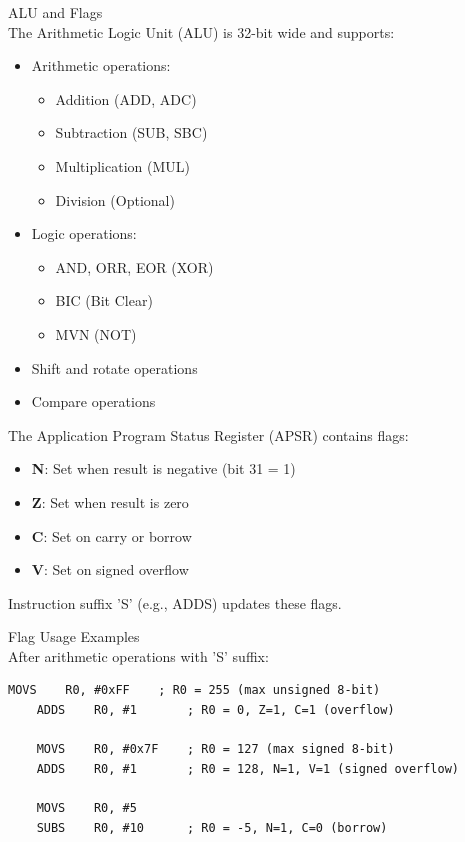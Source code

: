\begin{definition}{ALU and Flags}\\
The Arithmetic Logic Unit (ALU) is 32-bit wide and supports:
\begin{itemize}
  \item Arithmetic operations:
    \begin{itemize}
      \item Addition (ADD, ADC)
      \item Subtraction (SUB, SBC)
      \item Multiplication (MUL)
      \item Division (Optional)
    \end{itemize}
  \item Logic operations:
    \begin{itemize}
      \item AND, ORR, EOR (XOR)
      \item BIC (Bit Clear)
      \item MVN (NOT)
    \end{itemize}
  \item Shift and rotate operations
  \item Compare operations
\end{itemize}

The Application Program Status Register (APSR) contains flags:
\begin{itemize}
  \item \textbf{N}: Set when result is negative (bit 31 = 1)
  \item \textbf{Z}: Set when result is zero
  \item \textbf{C}: Set on carry or borrow
  \item \textbf{V}: Set on signed overflow
\end{itemize}

Instruction suffix 'S' (e.g., ADDS) updates these flags.
\end{definition}

\begin{example2}{Flag Usage Examples}\\
After arithmetic operations with 'S' suffix:
\begin{lstlisting}[language=armasm, style=base]
    MOVS    R0, #0xFF    ; R0 = 255 (max unsigned 8-bit)
    ADDS    R0, #1       ; R0 = 0, Z=1, C=1 (overflow)
    
    MOVS    R0, #0x7F    ; R0 = 127 (max signed 8-bit)
    ADDS    R0, #1       ; R0 = 128, N=1, V=1 (signed overflow)
    
    MOVS    R0, #5
    SUBS    R0, #10      ; R0 = -5, N=1, C=0 (borrow)
\end{lstlisting}
\end{example2}

